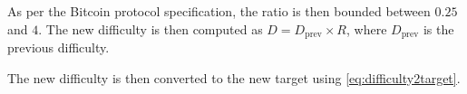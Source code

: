 As per the Bitcoin protocol specification, the ratio is then bounded between
\(0.25\) and \(4\). The new difficulty is then computed as \(D =
D_{\text{prev}} \times R\), where \(D_{\text{prev}}\) is the previous
difficulty.

The new difficulty is then converted to the new target using
\eqref{eq:difficulty2target}.
